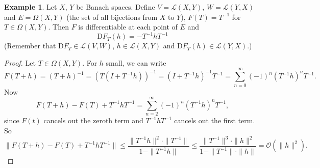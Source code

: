 \documentclass[12pt]{article}
\theoremstyle{plain}
\theoremstyle{definition}
\newtheorem*{eg}{Example}
\begin{document}
\begin{eg}
    Let $X$, $Y$ be Banach spaces.
    Define $V=\mathcal{L}(X,Y)$, $W=\mathcal{L}(Y, X)$ and $E=\Omega(X,Y)$ (the set of all bijections from $X$ to $Y$),
    $F(T) = T^{-1}$ for $T\in \Omega(X,Y)$.
    Then $F$ is differentiable at each point of $E$ and
    \[
        \mathrm{D}F_T(h) = -T^{-1}hT^{-1}
    \]
    (Remember that $\mathrm{D}F_T\in\mathcal{L}(V,W)$, $h\in\mathcal{L}(X,Y)$ and $\mathrm{D}F_T(h)\in\mathcal{L}(Y,X)$.)
\end{eg}
\begin{proof}
    Let $T\in\Omega(X,Y)$.
    For $h$ small, we can write 
    \[
        F(T+h) = (T+h)^{-1} = (T(I+T^{-1}h))^{-1} = (I+T^{-1}h)^{-1}T^{-1} = \sum_{n=0}^\infty (-1)^n(T^{-1}h)^nT^{-1}.
    \]
    Now
    \[
        F(T+h) - F(T) + T^{-1}hT^{-1}
        = \sum_{n=2}^\infty (-1)^n(T^{-1}h)^nT^{-1},
    \]
    since $F(t)$ cancels out the zeroth term and $T^{-1}hT^{-1}$ cancels out the first term.
    So
    \[
        \|F(T+h) - F(T) + T^{-1}hT^{-1}\|
        \leq \frac{\|T^{-1}h\|^2\cdot\|T^{-1}\|}{1-\|T^{-1}h\|}
        \leq \frac{\|T^{-1}\|^3\cdot\|h\|^2}{1-\|T^{-1}\|\cdot\|h\|}
        = \mathcal{O}(\|h\|^2).
    \]
\end{proof}
\end{document}
